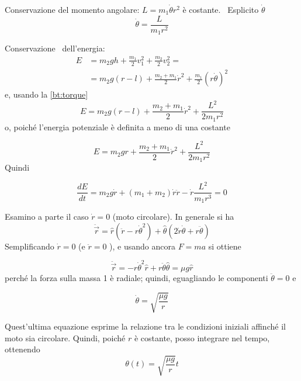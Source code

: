 \documentclass[../main.tex]{subfiles}
\begin{document}
Conservazione del momento angolare:
$L=m_1\dot \theta r^2$ \`e costante. \ Esplicito $ \dot \theta $
\begin{equation}
  \label{bt:torque}
  \dot \theta =\frac L{m_1r^2}
\end{equation}

Conservazione \ dell'energia:
\begin{align}
  E&=m_2 g h +      \frac{m_1}{2} v_1^2 +\frac{m_2}{2} v_2^2= \\
  &=m_2 g (r-l)+   \frac{m_2+m_1}{2} \dot r^2+ \frac{m_1}{2} (r\dot\theta)^2
\end{align}
e, usando la \cref{bt:torque}
\begin{equation}
  E=m_2 g (r-l)+   \frac{m_2+m_1}{2} \dot r^2+ \frac{L^2}{2 m_1 r^2}
\end{equation}
o, poich\'e l'energia
potenziale \`e definita a meno di una costante

\begin{equation}
  \label{bt:energy}
  E=m_2gr+\frac{m_2+m_1} 2\dot r^2+\frac{L^2}{2m_1r^2}
\end{equation}
Quindi

\begin{equation}
  \label{bt:denergy}
  \frac{dE}{dt}=m_2 g \dot r+(m_1+m_2) \dot r \ddot r - \dot r \frac{L^2}{m_1r^3}=0
\end{equation}

Esamino a parte il caso  $\dot r=0$ (moto circolare). In generale si ha
\begin{equation}
  \ddot{\vec r}=\hat r(\ddot r- r \dot \theta^2)+ \hat \theta ( 2 \dot r \dot \theta +r \ddot \theta)
\end{equation}
Semplificando  $\dot r=0$ (e $\ddot r=0$ ), e usando ancora $F=ma$ si ottiene 

\begin{equation}
  \ddot{ \vec r }= -r \dot \theta ^2 \hat r + r \ddot \theta \hat \theta =\mu g \hat r
\end{equation}
perch\'e la forza sulla massa 1 \`e radiale; quindi, eguagliando le componenti $\ddot \theta =0$ e

\begin{equation}
  \dot{\theta }=\sqrt{\frac{\mu g} r}
\end{equation}

Quest'ultima equazione esprime la relazione tra le condizioni iniziali affinch\'e il moto sia circolare. Quindi, poich\'e 
$r$ \`e costante, posso integrare nel tempo, ottenendo 
\begin{equation}
\theta(t)=\sqrt{\frac{\mu g}{r}}t
\end{equation}
\end{document}
